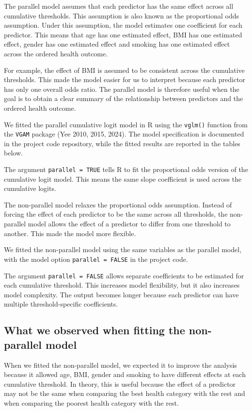 \documentclass{article}
\begin{document}
The parallel model assumes that each predictor has the same effect
across all cumulative thresholds. This assumption is also known as the
proportional odds assumption. Under this assumption, the model estimates
one coefficient for each predictor. This means that age has one
estimated effect, BMI has one estimated effect, gender has one estimated
effect and smoking has one estimated effect across the ordered health
outcome.

For example, the effect of BMI is assumed to be consistent across the
cumulative thresholds. This made the model easier for us to interpret
because each predictor has only one overall odds ratio. The parallel
model is therefore useful when the goal is to obtain a clear summary of
the relationship between predictors and the ordered health outcome.

We fitted the parallel cumulative logit model in R using the
\texttt{vglm()} function from the \texttt{VGAM} package (Yee 2010, 2015,
2024). The model specification is documented in the project code
repository, while the fitted results are reported in the tables below.

The argument \texttt{parallel\ =\ TRUE} tells R to fit the proportional
odds version of the cumulative logit model. This means the same slope
coefficient is used across the cumulative logits.

The non-parallel model relaxes the proportional odds assumption. Instead
of forcing the effect of each predictor to be the same across all
thresholds, the non-parallel model allows the effect of a predictor to
differ from one threshold to another. This made the model more flexible.

We fitted the non-parallel model using the same variables as the
parallel model, with the model option \texttt{parallel\ =\ FALSE} in the
project code.

The argument \texttt{parallel\ =\ FALSE} allows separate coefficients to
be estimated for each cumulative threshold. This increases model
flexibility, but it also increases model complexity. The output becomes
longer because each predictor can have multiple threshold-specific
coefficients.

\subsection{What we observed when fitting the non-parallel
model}\label{what-we-observed-when-fitting-the-non-parallel-model}

When we fitted the non-parallel model, we expected it to improve the
analysis because it allowed age, BMI, gender and smoking to have
different effects at each cumulative threshold. In theory, this is
useful because the effect of a predictor may not be the same when
comparing the best health category with the rest and when comparing the
poorest health category with the rest.
\end{document}
